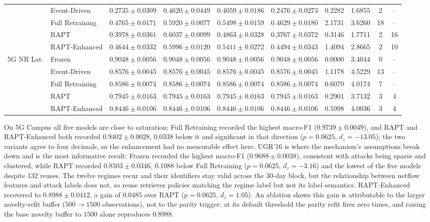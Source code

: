 \documentclass[conference]{IEEEtran}
\begin{document}
\begin{table}[t]
\begin{tabular}{@{}llcccccccc@{}}
 & Event-Driven    & $0.2735 \pm 0.0309$ & $0.4620 \pm 0.0449$ & $0.4059 \pm 0.0186$ & $0.2476 \pm 0.0273$ & 0.2282 & 1.6855 & 2 & -- \\
 & Full Retraining & $\mathbf{0.4765 \pm 0.0171}$ & $0.5920 \pm 0.0077$ & $0.5498 \pm 0.0159$ & $0.4629 \pm 0.0180$ & 2.1731 & 3.6260 & 18 & -- \\
 & RAPT            & $0.3978 \pm 0.0361$ & $0.6037 \pm 0.0099$ & $0.4863 \pm 0.0328$ & $0.3767 \pm 0.0372$ & 0.3146 & 1.7711 & 2 & 16 \\
 & RAPT-Enhanced   & $0.4644 \pm 0.0332$ & $0.5996 \pm 0.0120$ & $0.5411 \pm 0.0272$ & $0.4494 \pm 0.0343$ & 1.4094 & 2.8665 & 2 & 10 \\
\midrule
\multirow{5}{*}{5G NR Lat.}
 & Frozen          & $\mathbf{0.9048 \pm 0.0056}$ & $0.9048 \pm 0.0056$ & $0.9048 \pm 0.0056$ & $0.9048 \pm 0.0056$ & 0.0000 & 3.4044 & 0 & -- \\
 & Event-Driven    & $0.8576 \pm 0.0045$ & $0.8576 \pm 0.0045$ & $0.8576 \pm 0.0045$ & $0.8576 \pm 0.0045$ & 1.1178 & 4.5229 & 13 & -- \\
 & Full Retraining & $0.8586 \pm 0.0074$ & $0.8586 \pm 0.0074$ & $0.8586 \pm 0.0074$ & $0.8586 \pm 0.0074$ & 0.6070 & 4.0174 & 7 & -- \\
 & RAPT            & $0.7945 \pm 0.0163$ & $0.7945 \pm 0.0163$ & $0.7945 \pm 0.0163$ & $0.7945 \pm 0.0163$ & 0.2901 & 3.7132 & 3 & 4 \\
 & RAPT-Enhanced   & $0.8446 \pm 0.0106$ & $0.8446 \pm 0.0106$ & $0.8446 \pm 0.0106$ & $0.8446 \pm 0.0106$ & 0.5998 & 4.0036 & 3 & 4 \\
\bottomrule
\end{tabular}
\end{table}

On 5G Campus all five models are close to saturation: Full Retraining recorded the
highest macro-F1 ($0.9739 \pm 0.0049$), and RAPT and RAPT-Enhanced both recorded
$0.9402 \pm 0.0028$, $0.0338$ below it and significant in that direction
($p = 0.0625$, $d_z = -13.05$); the two variants agree to four decimals, so
the enhancement had no measurable effect here. UGR'16 is where the
mechanism's assumptions break down and is the most informative result: Frozen
recorded the highest macro-F1 ($0.9688 \pm 0.0038$), consistent with attacks being
sparse and clustered, while RAPT recorded $0.8503 \pm 0.0346$, $0.1088$ below Full
Retraining ($p = 0.0625$, $d_z = -3.16$) and the lowest of the five
models despite 132 reuses. The twelve regimes recur and their identifiers stay valid
across the 30-day block, but the relationship between netflow features and attack
labels does not, so reuse retrieves policies matching the regime label but not its
label semantics. RAPT-Enhanced recovered to $0.8988 \pm 0.0412$, a gain of $0.0485$
over RAPT ($p = 0.0625$, $d_z = 1.05$). An ablation shows this gain is attributable
to the larger novelty-refit buffer ($500 \to 1500$ observations), not to the parity
trigger: at its default threshold the parity refit fires zero times, and raising the
base novelty buffer to $1500$ alone reproduces $0.8988$.
\end{document}
